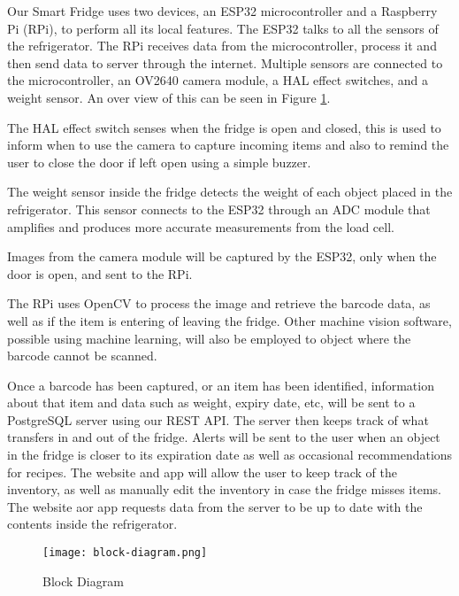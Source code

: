 Our Smart Fridge uses two devices, an ESP32 microcontroller and a Raspberry Pi (RPi), to perform all its local features.
The ESP32 talks to all the sensors of the refrigerator.
The RPi receives data from the microcontroller, process it and then send data to server through the internet.
Multiple sensors are connected to the microcontroller, an OV2640 camera module, a HAL effect switches, and a weight sensor.
An over view of this can be seen in Figure \ref{fig:block_diagram}.

The HAL effect switch senses when the fridge is open and closed, 
this is used to inform when to use the camera to capture incoming items and also to remind the user to close the door if left open using a simple buzzer.

The weight sensor inside the fridge detects the weight of each object placed in the refrigerator.
This sensor connects to the ESP32 through an ADC module that amplifies and produces more accurate measurements from the load cell.

Images from the camera module will be captured by the ESP32, only when the door is open, and sent to the RPi.

The RPi uses OpenCV to process the image and retrieve the barcode data, as well as if the item is entering of leaving the fridge.
Other machine vision software, possible using machine learning, will also be employed to object where the barcode cannot be scanned.

Once a barcode has been captured, or an item has been identified, 
information about that item and data such as weight, expiry date, etc, will be sent to a PostgreSQL server using our REST API.
The server then keeps track of what transfers in and out of the fridge.
Alerts will be sent to the user when an object in the fridge is closer to its expiration date as well as occasional recommendations for recipes. 
The website and app will allow the user to keep track of the inventory,
as well as manually edit the inventory in case the fridge misses items.
The website aor app requests data from the server to be up to date with the contents inside the refrigerator.

\begin{figure}[H]        
    \centering
    \texttt{[image: block-diagram.png]}
    \caption{Block Diagram}
    \label{fig:block_diagram}
\end{figure} 
